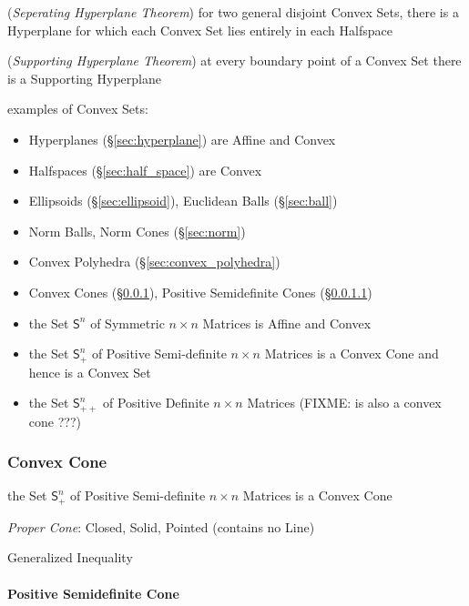 (\emph{Seperating Hyperplane Theorem}) for two general disjoint Convex Sets,
there is a Hyperplane for which each Convex Set lies entirely in each Halfspace

(\emph{Supporting Hyperplane Theorem}) at every boundary point of a Convex Set
there is a Supporting Hyperplane

examples of Convex Sets:
\begin{itemize}
  \item Hyperplanes (\S\ref{sec:hyperplane}) are Affine and Convex
  \item Halfspaces (\S\ref{sec:half_space}) are Convex
  \item Ellipsoids (\S\ref{sec:ellipsoid}), Euclidean Balls (\S\ref{sec:ball})
  \item Norm Balls, Norm Cones (\S\ref{sec:norm})
  \item Convex Polyhedra (\S\ref{sec:convex_polyhedra})
  \item Convex Cones (\S\ref{sec:convex_cone}), Positive Semidefinite Cones
    (\S\ref{sec:positive_semidefinite_cone})
  \item the Set $\mathsf{S}^n$ of Symmetric $n \times n$ Matrices is Affine and
    Convex
  \item the Set $\mathsf{S}_+^n$ of Positive Semi-definite $n \times n$
    Matrices is a Convex Cone and hence is a Convex Set
  \item the Set $\mathsf{S}_{++}^n$ of Positive Definite $n \times n$ Matrices
    (FIXME: is also a convex cone ???)
\end{itemize}



\subsubsection{Convex Cone}\label{sec:convex_cone}

the Set $\mathsf{S}_+^n$ of Positive Semi-definite $n \times n$ Matrices is a
Convex Cone

\emph{Proper Cone}: Closed, Solid, Pointed (contains no Line)

Generalized Inequality



\paragraph{Positive Semidefinite Cone}
\label{sec:positive_semidefinite_cone}\hfill



